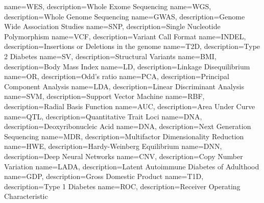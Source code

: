 {
	name=WES,
	description={Whole Exome Sequencing}
}
{
	name=WGS,
	description={Whole Genome Sequencing}
}
{
	name=GWAS,
	description={Genome Wide Association Studies}
}
{
	name=SNP,
	description={Single Nucleotide Polymorphism}
}
{
	name=VCF,
	description={Variant Call Format}
}
{
	name=INDEL,
	description={Insertions or Deletions in the genome}
}
{
	name=T2D,
	description={Type 2 Diabetes}
}
{
	name=SV,
	description={Structural Variants}
}
{
	name=BMI,
	description={Body Mass Index}
}
{
	name=LD,
	description={Linkage Disequilibrium}
}
{
	name=OR,
	description={Odd's ratio}
}
{
	name=PCA,
	description={Principal Component Analysis}
}
{
	name=LDA,
	description={Linear Discriminant Analysis}
}
{
	name=SVM,
	description={Support Vector Machine}
}
{
	name=RBF,
	description={Radial Basis Function}
}
{
	name=AUC,
	description={Area Under Curve}
}
{
	name=QTL,
	description={Quantitative Trait Loci}
}
{
	name=DNA,
	description={Deoxyribonucleic Acid}
}
{
	name=DNA,
	description={Next Generation Sequencing}
}
{
	name=MDR,
	description={Multifactor Dimensionality Reduction}
}
{
	name=HWE,
	description={Hardy-Weinberg Equilibrium}
}
{
	name=DNN,
	description={Deep Neural Networks}
}
{
	name=CNV,
	description={Copy Number Variation}
}
{
	name=LADA,
	description={Latent Autoimmune Diabetes of Adulthood}
}
{
	name=GDP,
	description={Gross Domestic Product}
}
{
	name=T1D,
	description={Type 1 Diabetes}
}
{
	name=ROC,
	description={Receiver Operating Characteristic}
}